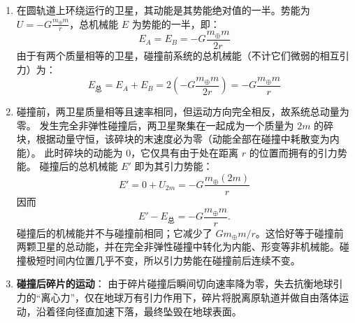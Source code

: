 \begin{solution}
\begin{enumerate}
    \item[(a)] 在圆轨道上环绕运行的卫星，其动能是其势能绝对值的一半。势能为 $U = -G\frac{m_\oplus m}{r}$，总机械能 $E$ 为势能的一半，即：
    $$ E_A = E_B = -G\frac{m_\oplus m}{2r} $$
    由于有两个质量相等的卫星，碰撞前系统的总机械能（不计它们微弱的相互引力）为：
    $$ E_{\text{总}} = E_A + E_B = 2 \left( -G\frac{m_\oplus m}{2r} \right) = -G\frac{m_\oplus m}{r} $$

    \item[(b)] 碰撞前，两卫星质量相等且速率相同，但运动方向完全相反，故系统总动量为零。
    发生完全非弹性碰撞后，两卫星聚集在一起成为一个质量为 $2m$ 的碎块，根据动量守恒，该碎块的末速度必为零（动能全部在碰撞中耗散变为内能）。
    此时碎块的动能为 $0$，它仅具有由于处在距离 $r$ 的位置而拥有的引力势能。
    碰撞后的总机械能 $E'$ 即为其引力势能：
    $$ E' = 0 + U_{2m} = -G\frac{m_\oplus (2m)}{r} $$
    因而
    $$ E'-E_{\text{总}}=-G\frac{m_\oplus m}{r}. $$
    碰撞后的机械能并不与碰撞前相同；它减少了 $Gm_\oplus m/r$。这恰好等于碰撞前两颗卫星的总动能，并在完全非弹性碰撞中转化为内能、形变等非机械能。碰撞极短时间内位置几乎不变，所以引力势能在碰撞前后连续不变。

    \item[(c)] \textbf{碰撞后碎片的运动}：
    由于碎片碰撞后瞬间切向速率降为零，失去抗衡地球引力的“离心力”，仅在地球万有引力作用下，碎片将脱离原轨道并做自由落体运动，沿着径向径直加速下落，最终坠毁在地球表面。
\end{enumerate}
\end{solution}

